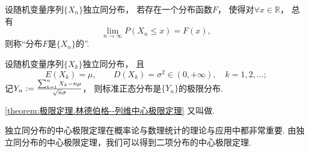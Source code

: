 \begin{definition}
设随机变量序列\(\{X_n\}\)独立同分布，
若存在一个分布函数\(F\)，
使得对\(\forall x\in\mathbb{R}\)，
总有\begin{equation*}
	\lim_{n\to\infty} P(X_n \leq x) = F(x),
\end{equation*}
则称“分布\(F\)是\(\{X_n\}\)的”.
\end{definition}

\begin{theorem}\label{theorem:极限定理.林德伯格--列维中心极限定理}
设随机变量序列\(\{X_k\}\)独立同分布，
且\begin{equation*}
	E(X_k)=\mu, \qquad
	D(X_k)=\sigma^2\in(0,+\infty),
	\quad k=1,2,\dotsc;
\end{equation*}
记\(
	Y_n
	:=
	\frac{\sum_{k=1}^n X_k - n\mu}{\sqrt{n} \sigma}
\)，
则标准正态分布是\(\{Y_n\}\)的极限分布.
\end{theorem}

\cref{theorem:极限定理.林德伯格--列维中心极限定理} 又叫做.

独立同分布的中心极限定理在概率论与数理统计的理论与应用中都非常重要.
由独立同分布的中心极限定理，我们可以得到二项分布的中心极限定理.

